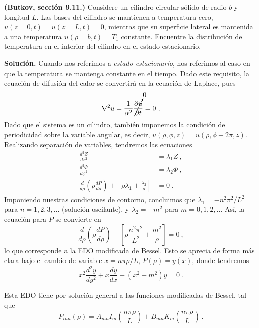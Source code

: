 \begin{ejemplo}
    \textbf{(Butkov, sección 9.11.)} Considere un cilindro circular sólido de radio $b$ y longitud $L$. Las bases del cilindro se mantienen a temperatura cero, $u(z = 0, t) = u(z = L, t) = 0$, mientras que su superficie lateral es mantenida a una temperatura $u(\rho = b, t) = T_1$ constante. Encuentre la distribución de temperatura en el interior del cilindro en el estado estacionario.

    \textbf{Solución.} Cuando nos referimos a \emph{estado estacionario}, nos referimos al caso en que la temperatura se mantenga constante en el tiempo. Dado este requisito, la ecuación de difusión del calor se convertirá en la ecuación de Laplace, pues
    \begin{equation*}
        \nabla^2 u = \frac{1}{\alpha^2} \cancelto{0}{\frac{\partial u}{\partial t}} = 0 \ .
    \end{equation*}
    Dado que el sistema es un cilindro, también imponemos la condición de periodicidad sobre la variable angular, es decir, $u(\rho, \phi, z) = u(\rho, \phi + 2\pi, z)$. Realizando separación de variables, tendremos las ecuaciones
    \begin{align*}
        \frac{d^2 Z}{dz^2} & = \lambda_1 Z \ , \\
        \frac{d^2 \Phi}{d\phi^2} & = \lambda_2 \Phi \ , \\
        \frac{d}{d\rho}\left( \rho \frac{dP}{d\rho} \right) + \left[ \rho \lambda_1 + \frac{\lambda_2}{\rho} \right] & = 0 \ .
    \end{align*} 
    Imponiendo nuestras condiciones de contorno, concluimos que $\lambda_1 = -n^2 \pi^2/L^2$ para $n = 1, 2, 3, \dots$ (solución oscilante), y $\lambda_2 = -m^2$ para $m = 0, 1, 2, \dots$ Así, la ecuación para $P$ se convierte en
    \begin{equation*}
        \frac{d}{d\rho}\left( \rho \frac{dP}{d\rho} \right) - \left[ \rho \frac{n^2\pi^2}{L^2} + \frac{m^2}{\rho} \right] = 0 \ ,
    \end{equation*} 
    lo que corresponde a la EDO modificada de Bessel. Esto se aprecia de forma más clara bajo el cambio de variable $x = n\pi \rho/L$, $P(\rho) = y(x)$, donde tendremos
    \begin{equation*}
        x^2 \frac{d^2 y}{dy^2} + x \frac{dy}{dx} - (x^2 + m^2)y = 0 \ .
    \end{equation*}

    Esta EDO tiene por solución general a las funciones modificadas de Bessel, tal que
    \begin{equation*}
        P_{mn}(\rho) = A_{mn} I_m\left( \frac{n\pi \rho}{L} \right) + B_{mn} K_m\left( \frac{n\pi \rho}{L} \right) \ .
    \end{equation*}


\end{ejemplo}
